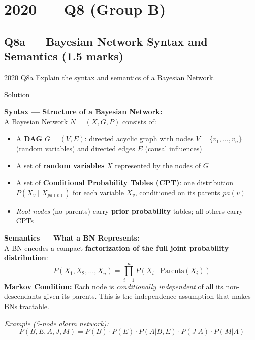 \documentclass[12pt,a4paper]{article}
\begin{document}
\newpage
\section{2020 --- Q8 (Group B)}

\subsection{Q8a --- Bayesian Network Syntax and Semantics (1.5 marks)}

\begin{qbox}{2020 Q8a}
Explain the syntax and semantics of a Bayesian Network.
\end{qbox}

\begin{solbox}{Solution}

\textbf{Syntax --- Structure of a Bayesian Network:}\\
A Bayesian Network $N = (X, G, P)$ consists of:
\begin{itemize}[noitemsep]
  \item A \textbf{DAG} $G = (V, E)$: directed acyclic graph with nodes $V=\{v_1,\ldots,v_n\}$ (random variables) and directed edges $E$ (causal influences)
  \item A set of \textbf{random variables} $X$ represented by the nodes of $G$
  \item A set of \textbf{Conditional Probability Tables (CPT)}: one distribution $P(X_v \mid X_{pa(v)})$ for each variable $X_v$, conditioned on its parents $pa(v)$
  \item \textit{Root nodes} (no parents) carry \textbf{prior probability} tables; all others carry CPTs
\end{itemize}

\textbf{Semantics --- What a BN Represents:}\\
A BN encodes a compact \textbf{factorization of the full joint probability distribution}:
\[
\boxed{P(X_1, X_2, \ldots, X_n) = \prod_{i=1}^{n} P(X_i \mid \text{Parents}(X_i))}
\]
\textbf{Markov Condition:} Each node is \textit{conditionally independent} of all its non-descendants given its parents. This is the independence assumption that makes BNs tractable.

\textit{Example (5-node alarm network):}
\[
P(B,E,A,J,M) = P(B)\cdot P(E)\cdot P(A|B,E)\cdot P(J|A)\cdot P(M|A)
\]
\end{solbox}
\end{document}
